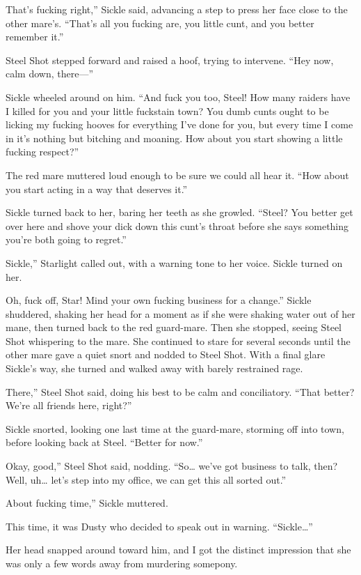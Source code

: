 \leavevmode{}That’s fucking right,” Sickle said, advancing a step to press her face close to the other mare’s. “That’s all you fucking are, you little cunt, and you better remember it.”

Steel Shot stepped forward and raised a hoof, trying to intervene. “Hey now, calm down, there—”

Sickle wheeled around on him. “And fuck you too, Steel! How many raiders have I killed for you and your little fuckstain town? You dumb cunts ought to be licking my fucking hooves for everything I’ve done for you, but every time I come in it’s nothing but bitching and moaning. How about you start showing a little fucking respect?”

The red mare muttered loud enough to be sure we could all hear it. “How about you start acting in a way that deserves it.”

Sickle turned back to her, baring her teeth as she growled. “Steel? You better get over here and shove your dick down this cunt’s throat before she says something you’re both going to regret.”

\leavevmode{}Sickle,” Starlight called out, with a warning tone to her voice. Sickle turned on her.

\leavevmode{}Oh, fuck off, Star! Mind your own fucking business for a change.” Sickle shuddered, shaking her head for a moment as if she were shaking water out of her mane, then turned back to the red guard-mare. Then she stopped, seeing Steel Shot whispering to the mare. She continued to stare for several seconds until the other mare gave a quiet snort and nodded to Steel Shot. With a final glare Sickle’s way, she turned and walked away with barely restrained rage.

\leavevmode{}There,” Steel Shot said, doing his best to be calm and conciliatory. “That better? We’re all friends here, right?”

Sickle snorted, looking one last time at the guard-mare, storming off into town, before looking back at Steel. “Better for now.”

\leavevmode{}Okay, good,” Steel Shot said, nodding. “So… we’ve got business to talk, then? Well, uh… let’s step into my office, we can get this all sorted out.”

\leavevmode{}About fucking time,” Sickle muttered.

This time, it was Dusty who decided to speak out in warning. “Sickle…”

Her head snapped around toward him, and I got the distinct impression that she was only a few words away from murdering somepony.


